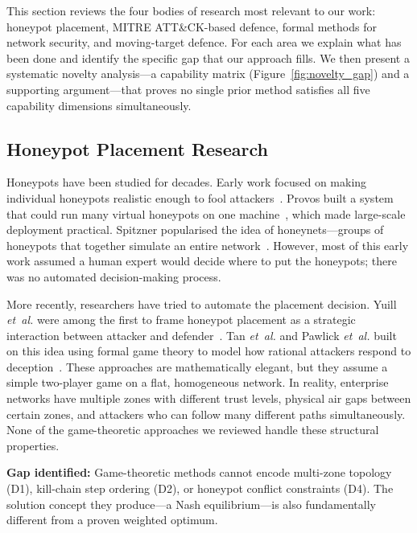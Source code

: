 \documentclass[journal]{IEEEtran}
\newcommand{\etal}{\emph{et~al.}}
\begin{document}
This section reviews the four bodies of research most
relevant to our work: honeypot placement, MITRE ATT\&CK-based
defence, formal methods for network security, and
moving-target defence.
For each area we explain what has been done and identify the
specific gap that our approach fills.
We then present a systematic novelty analysis---a capability
matrix (Figure~\ref{fig:novelty_gap}) and a supporting
argument---that proves no single prior method satisfies all
five capability dimensions simultaneously.

\subsection{Honeypot Placement Research}

Honeypots have been studied for decades.
Early work focused on making individual honeypots realistic
enough to fool attackers~\cite{spitzner2003}.
Provos built a system that could run many virtual honeypots
on one machine~\cite{provos2004}, which made large-scale
deployment practical.
Spitzner popularised the idea of
honeynets---groups of honeypots that together simulate an
entire network~\cite{spitzner2003}.
However, most of this early work assumed a human expert
would decide where to put the honeypots; there was no
automated decision-making process.

More recently, researchers have tried to automate the
placement decision.
Yuill \etal{} were among the first to frame honeypot
placement as a strategic interaction between attacker and
defender~\cite{yuill2004}.
Tan \etal{} and Pawlick \etal{} built on this idea using
formal game theory to model how rational attackers respond to
deception~\cite{tan2011,pawlick2019}.
These approaches are mathematically elegant, but they assume
a simple two-player game on a flat, homogeneous network.
In reality, enterprise networks have multiple zones with
different trust levels, physical air gaps between certain
zones, and attackers who can follow many different paths
simultaneously.
None of the game-theoretic approaches we reviewed handle
these structural properties.

\textbf{Gap identified:} Game-theoretic methods cannot encode
multi-zone topology (D1), kill-chain step ordering (D2), or
honeypot conflict constraints (D4).
The solution concept they produce---a Nash equilibrium---is
also fundamentally different from a proven weighted optimum.

\end{document}
